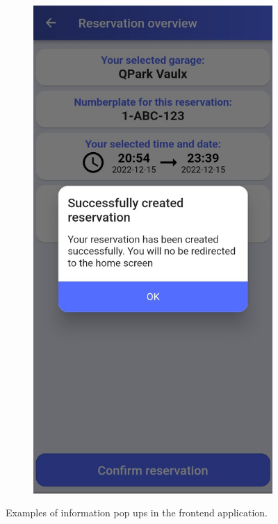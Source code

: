 \begin{appendices}
\begin{figure}[!htp]
\begin{subfigure}[b]{0.30\textwidth}
     \end{subfigure}
     \hfill
     \begin{subfigure}[b]{0.30\textwidth}
         \centering
         \includegraphics[width=\textwidth]{images/dialog4.jpg}
     \end{subfigure}
        \caption{Examples of information pop ups in the frontend application.}
        \label{fig:information-dialogs}
\end{figure}


\end{appendices}
